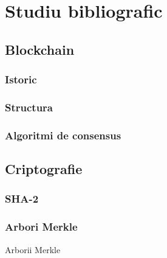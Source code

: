 \chapter{Studiu bibliografic}

\section{Blockchain}
\subsection{Istoric}
\subsection{Structura}
\subsection{Algoritmi de consensus}

\section{Criptografie}
\subsection{SHA-2}

\subsection{Arbori Merkle}

Arborii Merkle \cite{merkle1987digital}